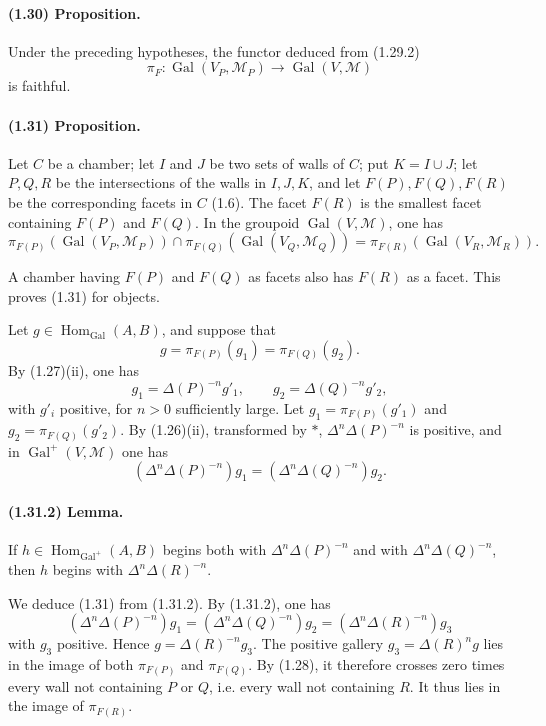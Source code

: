 \documentclass[10pt]{article}
\begin{document}
\paragraph{(1.30) Proposition.} Under the preceding hypotheses, the functor deduced from (1.29.2)
\[
\pi_F:\operatorname{Gal}(V_P,\mathcal M_P)\longrightarrow\operatorname{Gal}(V,\mathcal M)
\]
is faithful.

\paragraph{(1.31) Proposition.} Let \(C\) be a chamber; let \(I\) and \(J\) be two sets of walls of \(C\); put \(K=I\cup J\); let \(P,Q,R\) be the intersections of the walls in \(I,J,K\), and let \(F(P),F(Q),F(R)\) be the corresponding facets in \(C\) (1.6). The facet \(F(R)\) is the smallest facet containing \(F(P)\) and \(F(Q)\). In the groupoid \(\operatorname{Gal}(V,\mathcal M)\), one has
\[
\pi_{F(P)}(\operatorname{Gal}(V_P,\mathcal M_P))\cap
\pi_{F(Q)}(\operatorname{Gal}(V_Q,\mathcal M_Q))
=
\pi_{F(R)}(\operatorname{Gal}(V_R,\mathcal M_R)).
\]

A chamber having \(F(P)\) and \(F(Q)\) as facets also has \(F(R)\) as a facet. This proves (1.31) for objects.

Let \(g\in\operatorname{Hom}_{\operatorname{Gal}}(A,B)\), and suppose that
\[
g=\pi_{F(P)}(g_1)=\pi_{F(Q)}(g_2).
\]
By (1.27)(ii), one has
\[
g_1=\Delta(P)^{-n}g'_1,\qquad
g_2=\Delta(Q)^{-n}g'_2,
\]
with \(g'_i\) positive, for \(n>0\) sufficiently large. Let \(g_1=\pi_{F(P)}(g'_1)\) and \(g_2=\pi_{F(Q)}(g'_2)\). By (1.26)(ii), transformed by \(*\), \(\Delta^n\Delta(P)^{-n}\) is positive, and in \(\operatorname{Gal}^+(V,\mathcal M)\) one has
\[
\tag{1.31.1}
(\Delta^n\Delta(P)^{-n})g_1=(\Delta^n\Delta(Q)^{-n})g_2.
\]

\paragraph{(1.31.2) Lemma.} If \(h\in\operatorname{Hom}_{\operatorname{Gal}^+}(A,B)\) begins both with \(\Delta^n\Delta(P)^{-n}\) and with \(\Delta^n\Delta(Q)^{-n}\), then \(h\) begins with \(\Delta^n\Delta(R)^{-n}\).

We deduce (1.31) from (1.31.2). By (1.31.2), one has
\[
(\Delta^n\Delta(P)^{-n})g_1=(\Delta^n\Delta(Q)^{-n})g_2=(\Delta^n\Delta(R)^{-n})g_3
\]
with \(g_3\) positive. Hence \(g=\Delta(R)^{-n}g_3\). The positive gallery \(g_3=\Delta(R)^n g\) lies in the image of both \(\pi_{F(P)}\) and \(\pi_{F(Q)}\). By (1.28), it therefore crosses zero times every wall not containing \(P\) or \(Q\), i.e. every wall not containing \(R\). It thus lies in the image of \(\pi_{F(R)}\).
\end{document}
